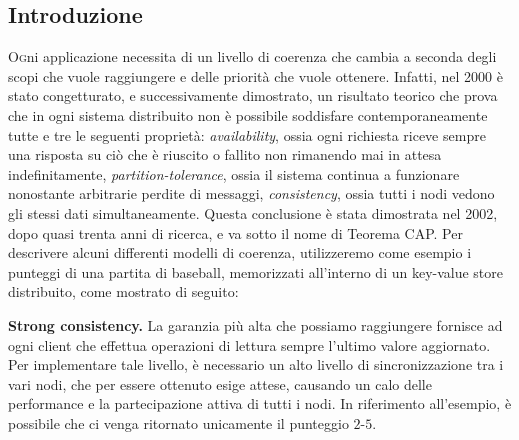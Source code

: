 \documentclass[twoside]{article}
\begin{document}
\begin{multicols}{2} %

\section{Introduzione}
\label{sec:introduzione}
\lettrine[nindent=0em,lines=2]{O} gni applicazione necessita di un livello di coerenza che cambia a seconda degli scopi che vuole raggiungere e delle priorità che vuole ottenere. Infatti, nel 2000 è stato congetturato, e successivamente dimostrato, un risultato teorico che prova che in ogni sistema distribuito non è possibile soddisfare contemporaneamente tutte e tre le seguenti proprietà: \emph{availability}, ossia ogni richiesta riceve sempre una risposta su ciò che è riuscito o fallito non rimanendo mai in attesa indefinitamente, \emph{partition-tolerance}, ossia il sistema continua a funzionare nonostante arbitrarie perdite di messaggi, \emph{consistency}, ossia tutti i nodi vedono gli stessi dati simultaneamente. Questa conclusione è stata dimostrata nel 2002, dopo quasi trenta anni di ricerca, e va sotto il nome di Teorema CAP.
Per descrivere alcuni differenti modelli di coerenza, utilizzeremo come esempio i punteggi di una partita di baseball, memorizzati all'interno di un key-value store distribuito, come mostrato di seguito:
\begin{table}[H]
\centering
{}
\caption{Esempio di punteggio nel baseball.}
\label{tab:punteggio-baseball}
\end{table}

\textbf{Strong consistency.} La garanzia più alta che possiamo raggiungere fornisce ad ogni client che effettua operazioni di lettura sempre l'ultimo valore aggiornato. Per implementare tale livello, è necessario un alto livello di sincronizzazione tra i vari nodi, che per essere ottenuto esige attese, causando un calo delle performance e la partecipazione attiva di tutti i nodi. In riferimento all'esempio, è possibile che ci venga ritornato unicamente il punteggio $2$-$5$.


\end{multicols}
\end{document}
